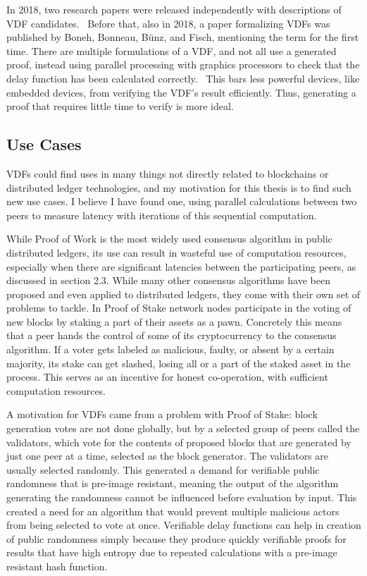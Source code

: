 In 2018, two research papers were released independently with descriptions of VDF candidates.~\cite{Wesolowski2018-rf, Pietrzak2018-xs} Before that, also in 2018, a paper formalizing VDFs was published by Boneh, Bonneau, Bünz, and Fisch, mentioning the term for the first time. There are multiple formulations of a VDF, and not all use a generated proof, instead using parallel processing with graphics processors to check that the delay function has been calculated correctly.~\cite{Yakovenko2018-zn} This bars less powerful devices, like embedded devices, from verifying the VDF's result efficiently. Thus, generating a proof that requires little time to verify is more ideal.~\cite{Boneh_undated-ml}

\subsection{Use Cases}
VDFs could find uses in many things not directly related to blockchains or distributed ledger technologies, and my motivation for this thesis is to find such new use cases. I believe I have found one, using parallel calculations between two peers to measure latency with iterations of this sequential computation.

While Proof of Work is the most widely used consensus algorithm in public distributed ledgers, its use can result in wasteful use of computation resources, especially when there are significant latencies between the participating peers, as discussed in section 2.3. While many other consensus algorithms have been proposed and even applied to distributed ledgers, they come with their own set of problems to tackle. In Proof of Stake network nodes participate in the voting of new blocks by staking a part of their assets as a pawn. Concretely this means that a peer hands the control of some of its cryptocurrency to the consensus algorithm. If a voter gets labeled as malicious, faulty, or absent by a certain majority, its stake can get slashed, losing all or a part of the staked asset in the process. This serves as an incentive for honest co-operation, with sufficient computation resources.

A motivation for VDFs came from a problem with Proof of Stake: block generation votes are not done globally, but by a selected group of peers called the validators, which vote for the contents of proposed blocks that are generated by just one peer at a time, selected as the block generator. The validators are usually selected randomly. This generated a demand for verifiable public randomness that is pre-image resistant, meaning the output of the algorithm generating the randomness cannot be influenced before evaluation by input. This created a need for an algorithm that would prevent multiple malicious actors from being selected to vote at once. Verifiable delay functions can help in creation of public randomness simply because they produce quickly verifiable proofs for results that have high entropy due to repeated calculations with a pre-image resistant hash function.

